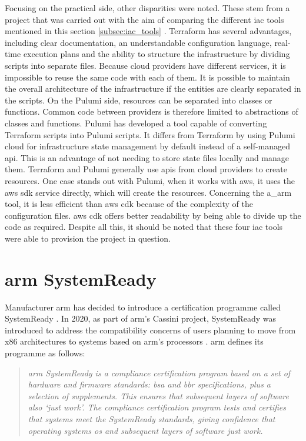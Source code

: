 Focusing on the practical side, other disparities were noted. These stem from a project that was carried out with the aim of comparing the different \acrshort{iac} tools mentioned in this section \ref{subsec:iac_tools} \cite{iac_tools}. Terraform has several advantages, including clear documentation, an understandable configuration language, real-time execution plans and the ability to structure the infrastructure by dividing scripts into separate files. Because \gls{cloud} providers have different services, it is impossible to reuse the same code with each of them. It is possible to maintain the overall architecture of the infrastructure if the entities are clearly separated in the scripts. On the Pulumi side, resources can be separated into classes or functions. Common code between providers is therefore limited to abstractions of classes and functions. Pulumi has developed a tool capable of converting Terraform scripts into Pulumi scripts. It differs from Terraform by using Pulumi \Gls{cloud} for infrastructure state management by default instead of a self-managed \acrshort{api}. This is an advantage of not needing to store state files locally and manage them. Terraform and Pulumi generally use \acrshort{api}s from \gls{cloud} providers to create resources. One case stands out with Pulumi, when it works with \gls{aws}, it uses the \gls{aws} \acrshort{sdk} service directly, which will create the resources. Concerning the \acrlong{a_arm} tool, it is less efficient than \gls{aws} \acrshort{cdk} because of the complexity of the configuration files. \gls{aws} \acrshort{cdk} offers better readability by being able to divide up the code as required. Despite all this, it should be noted that these four \acrshort{iac} tools were able to provision the project in question. \cite{iac_tools}


\section{\texorpdfstring{\gls{arm}}{} SystemReady}

Manufacturer \gls{arm} has decided to introduce a certification programme called SystemReady \cite{systemready_program}. In 2020, as part of \gls{arm}'s Cassini project, SystemReady was introduced to address the compatibility concerns of users planning to move from x86 architectures to systems based on \gls{arm}'s processors \cite{systemready_approval}. \gls{arm} defines its programme as follows:
\begin{quote}
    \textit{\gls{arm} SystemReady is a compliance certification program based on a set of hardware and firmware standards: \acrfull{bsa} and \acrfull{bbr} specifications, plus a selection of supplements. This ensures that subsequent layers of software also ‘just work’. The compliance certification program tests and certifies that systems meet the SystemReady standards, giving confidence that operating systems \acrshort{os} and subsequent layers of software just work. \cite{systemready_program}}\\
\end{quote}

